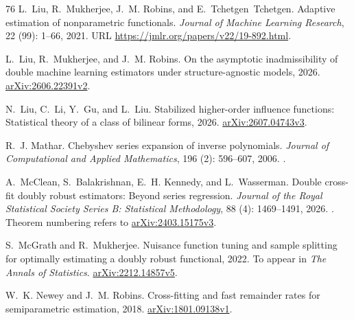 \documentclass[12pt,oneside,openany]{book}
\numberwithin{equation}{chapter}
\theoremstyle{plain}
\theoremstyle{definition}
\theoremstyle{remark}
\begin{document}
\begin{thebibliography}{76}
L.~Liu, R.~Mukherjee, J.~M. Robins, and E.~Tchetgen~Tchetgen.
\newblock Adaptive estimation of nonparametric functionals.
\newblock \emph{Journal of Machine Learning Research}, 22
  (99): 1--66, 2021.
\newblock URL \url{https://jmlr.org/papers/v22/19-892.html}.

L.~Liu, R.~Mukherjee, and J.~M. Robins.
\newblock On the asymptotic inadmissibility of double machine learning
  estimators under structure-agnostic models, 2026{}.
\newblock \href{https://arxiv.org/abs/2606.22391v2}{arXiv:2606.22391v2}.

N.~Liu, C.~Li, Y.~Gu, and L.~Liu.
\newblock Stabilized higher-order influence functions: Statistical theory of a
  class of bilinear forms, 2026{}.
\newblock \href{https://arxiv.org/abs/2607.04743v3}{arXiv:2607.04743v3}.

R.~J. Mathar.
\newblock Chebyshev series expansion of inverse polynomials.
\newblock \emph{Journal of Computational and Applied Mathematics}, 196
  (2): 596--607, 2006.
\newblock {}.

A.~McClean, S.~Balakrishnan, E.~H. Kennedy, and L.~Wasserman.
\newblock Double cross-fit doubly robust estimators: Beyond series regression.
\newblock \emph{Journal of the Royal Statistical Society Series B: Statistical
  Methodology}, 88 (4): 1469--1491, 2026.
\newblock {}.
\newblock Theorem numbering refers to
  \href{https://arxiv.org/abs/2403.15175v3}{arXiv:2403.15175v3}.

S.~McGrath and R.~Mukherjee.
\newblock Nuisance function tuning and sample splitting for optimally
  estimating a doubly robust functional, 2022.
\newblock To appear in \emph{The Annals of Statistics}.
  \href{https://arxiv.org/abs/2212.14857v5}{arXiv:2212.14857v5}.

W.~K. Newey and J.~M. Robins.
\newblock Cross-fitting and fast remainder rates for semiparametric estimation,
  2018.
\newblock \href{https://arxiv.org/abs/1801.09138v1}{arXiv:1801.09138v1}.


\end{thebibliography}
\end{document}
